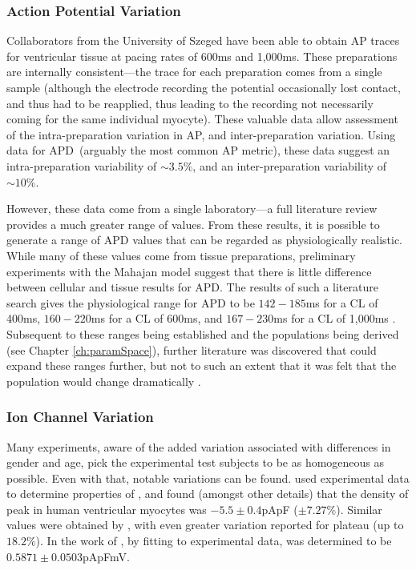 \documentclass[../thesis-main.tex]{subfiles}
\begin{document}
 \subsubsection{Action Potential Variation}
 \label{subsubsec:ap-variation}
 Collaborators from the University of Szeged have been able to obtain AP traces for ventricular tissue at pacing rates of 600ms and 1,000ms. These preparations are internally consistent---the trace for each preparation comes from a single sample (although the electrode recording the potential occasionally lost contact, and thus had to be reapplied, thus leading to the recording not necessarily coming for the same individual myocyte). These valuable data allow assessment of the intra-preparation variation in AP, and inter-preparation variation. Using data for APD~(arguably the most common AP metric), these data suggest an intra-preparation variability of $\sim3.5\%$, and an inter-preparation variability of $\sim10\%$.
 
 However, these data come from a single laboratory---a full literature review provides a much greater range of values. From these results, it is possible to generate a range of APD values that can be regarded as physiologically realistic. While many of these values come from tissue preparations, preliminary experiments with the Mahajan model suggest that there is little difference between cellular and tissue results for APD. The results of such a literature search gives the physiological range for APD to be $142-185$ms for a CL of 400ms, $160-220$ms for a CL of 600ms, and $167-230$ms for a CL of 1,000ms \citep{Biagetti2006, Szigligeti1996, Yan2001, Jung2011, Goldhaber2005, Wu2011, Wu2008, Wu2008a, Chen2006, Kirchhof2003, Eckardt1998, Zabel1997, Zabel1997a, Kurz1993, McIntosh2000}. Subsequent to these ranges being established and the populations being derived (see Chapter \ref{ch:paramSpace}), further literature was discovered that could expand these ranges further, but not to such an extent that it was felt that the population would change dramatically \citep{Wu2006}.
 
 \subsubsection{Ion Channel Variation}
 \label{subsubsec:ionChannel-variation}
 Many experiments, aware of the added variation associated with differences in gender and age, pick the experimental test subjects to be as homogeneous as possible. Even with that, notable variations can be found. \citet{Fulop2004} used experimental data to determine properties of \ica{}, and found (amongst other details) that the density of peak \ica{} in human ventricular myocytes was $-5.5\pm0.4$pApF ($\pm7.27\%$). Similar values were obtained by \citet{Li1999}, with even greater variation reported for plateau \ica{} (up to $18.2\%$). In the work of \citet{Fink2008}, by fitting to experimental data, \gkix{} was determined to be $0.5871\pm0.0503$pApFmV.
 
\end{document}
